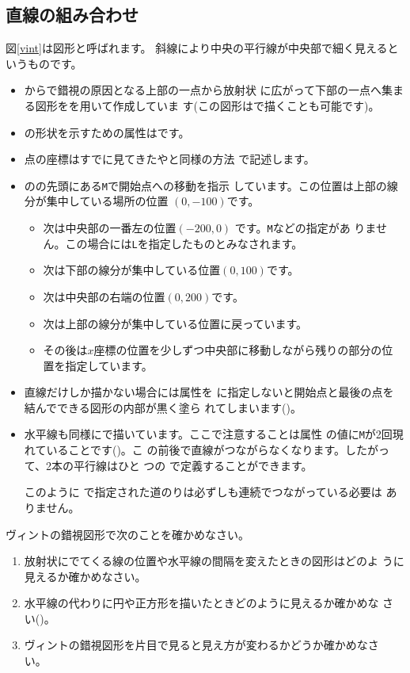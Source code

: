 \subsection{直線の組み合わせ}
図\ref{vint}は図形と呼ばれます。
斜線により中央の平行線が中央部で細く見えるというものです。
\begin{itemize}
 \item {}からで錯視の原因となる上部の一点から放射状
       に広がって下部の一点へ集まる図形をを用いて作成していま
       す(この図形はで描くことも可能です)。
 \item {}の形状を示すための属性はです。
 \item 点の座標はすでに見てきたやと同様の方法
       で記述します。
 \item {}のの先頭にある\texttt{M}で開始点への移動を指示
       しています。この位置は上部の線分が集中している場所の位置
       $(0,-100)$です。
\begin{itemize}
 \item 次は中央部の一番左の位置$(-200,0)$ です。\texttt{M}などの指定があ
       りません。この場合には\texttt{L}を指定したものとみなされます。
 \item 次は下部の線分が集中している位置$(0,100)$です。
 \item 次は中央部の右端の位置$(0,200)$です。
 \item 次は上部の線分が集中している位置に戻っています。
 \item その後は$x$座標の位置を少しずつ中央部に移動しながら残りの部分の位
       置を指定しています。
\end{itemize}
 \item 直線だけしか描かない場合には属性を
       に指定しないと開始点と最後の点を結んでできる図形の内部が黒く塗ら
       れてしまいます()。
 \item 水平線も同様にで描いています。ここで注意することは属性
       の値に\texttt{M}が2回現れていることです()。こ
       の前後で直線がつながらなくなります。したがって、2本の平行線はひと
       つの で定義することができます。

このように で指定された道のりは必ずしも連続でつながっている必要は
ありません。
\end{itemize}
\begin{Problem}\upshape\label{vint-path}
 ヴィントの錯視図形で次のことを確かめなさい。
\begin{enumerate}
 \item 放射状にでてくる線の位置や水平線の間隔を変えたときの図形はどのよ
       うに見えるか確かめなさい。
 \item 水平線の代わりに円や正方形を描いたときどのように見えるか確かめな
       さい(\cite[85ページ参照]{OIwCD})。
 \item ヴィントの錯視図形を片目で見ると見え方が変わるかどうか確かめなさ
       い。
\end{enumerate}
\end{Problem}
